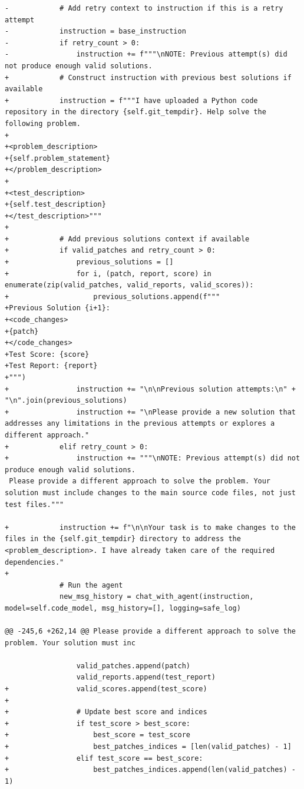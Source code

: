 \documentclass{article}
\begin{document}
\begin{lstlisting}[style=diffstyle]
-            # Add retry context to instruction if this is a retry attempt
-            instruction = base_instruction
-            if retry_count > 0:
-                instruction += f"""\nNOTE: Previous attempt(s) did not produce enough valid solutions. 
+            # Construct instruction with previous best solutions if available
+            instruction = f"""I have uploaded a Python code repository in the directory {self.git_tempdir}. Help solve the following problem.
+
+<problem_description>
+{self.problem_statement}
+</problem_description>
+
+<test_description>
+{self.test_description}
+</test_description>"""
+
+            # Add previous solutions context if available
+            if valid_patches and retry_count > 0:
+                previous_solutions = []
+                for i, (patch, report, score) in enumerate(zip(valid_patches, valid_reports, valid_scores)):
+                    previous_solutions.append(f"""
+Previous Solution {i+1}:
+<code_changes>
+{patch}
+</code_changes>
+Test Score: {score}
+Test Report: {report}
+""")
+                instruction += "\n\nPrevious solution attempts:\n" + "\n".join(previous_solutions)
+                instruction += "\nPlease provide a new solution that addresses any limitations in the previous attempts or explores a different approach."
+            elif retry_count > 0:
+                instruction += """\nNOTE: Previous attempt(s) did not produce enough valid solutions. 
 Please provide a different approach to solve the problem. Your solution must include changes to the main source code files, not just test files."""
 
+            instruction += f"\n\nYour task is to make changes to the files in the {self.git_tempdir} directory to address the <problem_description>. I have already taken care of the required dependencies."
+
             # Run the agent
             new_msg_history = chat_with_agent(instruction, model=self.code_model, msg_history=[], logging=safe_log)
             
@@ -245,6 +262,14 @@ Please provide a different approach to solve the problem. Your solution must inc
 
                 valid_patches.append(patch)
                 valid_reports.append(test_report)
+                valid_scores.append(test_score)
+
+                # Update best score and indices
+                if test_score > best_score:
+                    best_score = test_score
+                    best_patches_indices = [len(valid_patches) - 1]
+                elif test_score == best_score:
+                    best_patches_indices.append(len(valid_patches) - 1)
 

\end{lstlisting}
\end{document}
